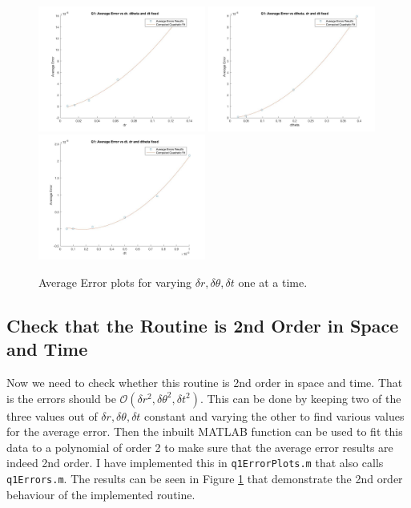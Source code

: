 \documentclass{article}
\begin{document}
	\begin{figure}[h!]
		\centering
		\includegraphics[width = 0.49\textwidth]{fig_q1_dr}
		\includegraphics[width = 0.49\textwidth]{fig_q1_dtheta}
		\includegraphics[width = 0.49\textwidth]{fig_q1_dt}
		\caption{Average Error plots for varying $\delta r, \delta \theta, \delta t$ one at a time.}
		\label{fig:q1Errors}
	\end{figure}

\subsection{Check that the Routine is 2nd Order in Space and Time}

Now we need to check whether this routine is 2nd order in space and time. That is the errors should be $\mathcal{O}(\delta r^2,\delta \theta^2,\delta t^2)$. This can be done by keeping two of the three values out of $\delta r, \delta \theta, \delta t$ constant and varying the other to find various values for the average error. Then the inbuilt MATLAB function can be used to fit this data to a polynomial of order 2 to make sure that the average error results are indeed 2nd order. I have implemented this in \texttt{q1ErrorPlots.m} that also calls \texttt{q1Errors.m}. The results can be seen in Figure \ref{fig:q1Errors} that demonstrate the 2nd order behaviour of the implemented routine.
\end{document}
